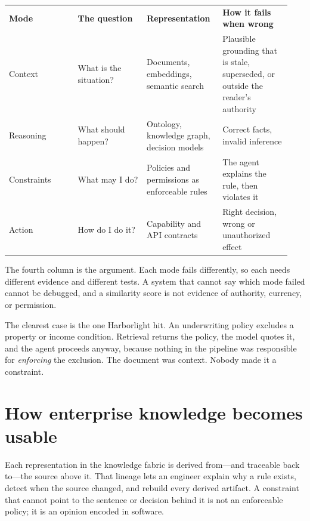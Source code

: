 \BookTableStart
\fontsize{7.2}{9}\selectfont
\begin{tabular}{@{}Y{0.2350\linewidth}Y{0.2350\linewidth}Y{0.2350\linewidth}Y{0.2350\linewidth}@{}}
\color{white}\bfseries Mode & \color{white}\bfseries The question & \color{white}\bfseries Representation & \color{white}\bfseries How it fails when wrong \\
Context & What is the situation? & Documents, embeddings, semantic search & Plausible grounding that is stale, superseded, or outside the reader's authority \\
Reasoning & What should happen? & Ontology, knowledge graph, decision models & Correct facts, invalid inference \\
Constraints & What may I do? & Policies and permissions as enforceable rules & The agent explains the rule, then violates it \\
Action & How do I do it? & Capability and API contracts & Right decision, wrong or unauthorized effect \\
\end{tabular}
\BookTableEnd

The fourth column is the argument. Each mode fails differently, so each needs different evidence and different tests. A system that cannot say which mode failed cannot be debugged, and a similarity score is not evidence of authority, currency, or permission.\par

The clearest case is the one Harborlight hit. An underwriting policy excludes a property or income condition. Retrieval returns the policy, the model quotes it, and the agent proceeds anyway, because nothing in the pipeline was responsible for \emph{enforcing} the exclusion. The document was context. Nobody made it a constraint.\par

\section{How enterprise knowledge becomes usable}

Each representation in the knowledge fabric is derived from—and traceable back to—the source above it. That lineage lets an engineer explain why a rule exists, detect when the source changed, and rebuild every derived artifact. A constraint that cannot point to the sentence or decision behind it is not an enforceable policy; it is an opinion encoded in software.\par

